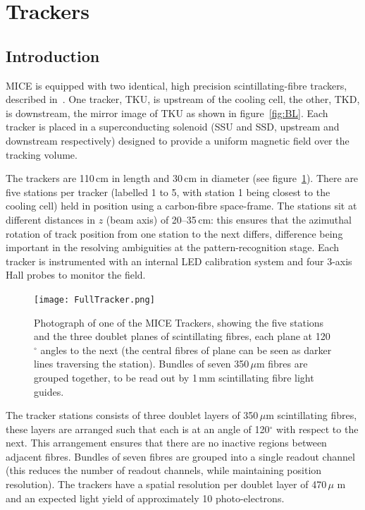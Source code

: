 \graphicspath{{06-Tracker/Figures/}}

\section{Trackers}
\label{Sect:Tracker}

\subsection{Introduction}
MICE is equipped with two identical, high precision scintillating-fibre trackers, described in~\cite{Ellis:2010bb}. One tracker, TKU, is upstream of the cooling cell, the other, TKD, is downstream, the mirror image of TKU as shown in figure~\ref{fig:BL}.
Each tracker is placed in a superconducting solenoid (SSU and SSD, upstream and downstream respectively) designed to provide a uniform magnetic field over the tracking volume. 


The trackers are 110\,cm in length and 30\,cm in diameter (see figure~\ref{Figure:FullTracker}). There are five stations per tracker (labelled 1 to 5, with station 1 being closest to the cooling cell) held in position using a carbon-fibre space-frame. The stations sit at different distances in $z$ (beam axis) of 20--35\,cm: this ensures that the azimuthal rotation of track position from one station to the next differs, difference being important in the resolving ambiguities at the pattern-recognition stage. Each tracker is instrumented with an internal LED calibration system and four 3-axis Hall probes to monitor the field.

\begin{figure}[ht]
\begin{center}
\texttt{[image: FullTracker.png]}
\end{center}
\caption{Photograph of one of the MICE Trackers, showing the five stations and the three doublet planes of scintillating fibres, each plane at 120$^\circ$ angles to the next (the central fibres of plane can be seen as darker lines traversing the station). Bundles of seven 350\,$\mu$m fibres are grouped together, to be read out by 1\,mm scintillating fibre light guides.}
\label{Figure:FullTracker}
\end{figure}

The tracker stations consists of three doublet layers of 350\,$\mu$m scintillating fibres, these layers are arranged such that each is at an angle of 120$^\circ$ with respect to the next. This arrangement ensures that there are no inactive regions between adjacent fibres. Bundles of seven fibres are grouped into a single readout channel (this reduces the number of readout channels, while maintaining position resolution). The trackers have a spatial resolution per doublet layer of 470\,$\mu$ m and an expected light yield of approximately 10 photo-electrons.

